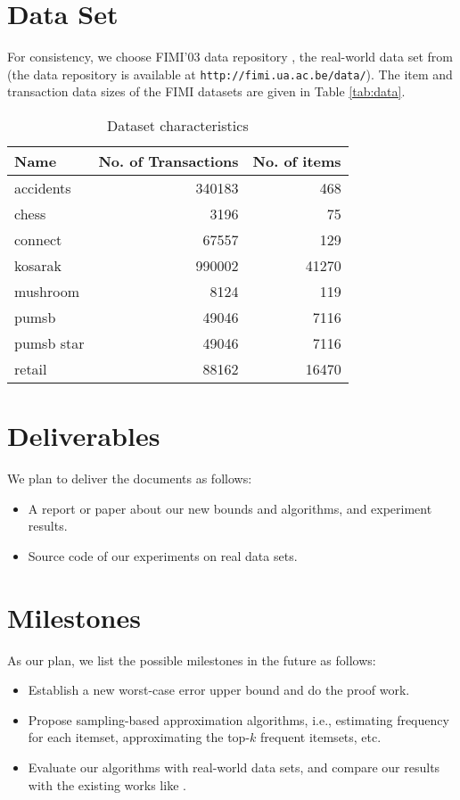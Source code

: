 \documentclass{article}
\begin{document}
\section{Data Set}
For consistency, we choose FIMI'03 data repository \cite{GZ04}, the real-world data set from \cite{RU15} (the data repository is available at \texttt{http://fimi.ua.ac.be/data/}). The item and transaction data sizes of the FIMI datasets are given in Table \ref{tab:data}.

\begin{table}[!t]
\centering
\begin{tabular}{l | r r}
\hline
Name & No. of Transactions & No. of items \\
\hline
accidents & 340183 & 468 \\
chess & 3196 & 75 \\
connect & 67557 & 129 \\
kosarak & 990002 & 41270 \\
mushroom & 8124 & 119 \\
pumsb & 49046 & 7116 \\
pumsb star & 49046 &  7116 \\
retail  & 88162 & 16470 \\
\hline

\end{tabular}
\caption{Dataset characteristics}
\end{table}

\section{Deliverables}
We plan to deliver the documents as follows:
\begin{itemize}
\item A report or paper about our new bounds and algorithms, and experiment results.
\item Source code of our experiments on real data sets.
\end{itemize}

\section{Milestones}
As our plan, we list the possible milestones in the future as follows:
\begin{itemize}
\item Establish a new worst-case error upper bound and do the proof work.
\item Propose sampling-based approximation algorithms, i.e., estimating frequency for each itemset, approximating the top-$k$ frequent itemsets, etc.
\item Evaluate our algorithms with real-world data sets, and compare our results with the existing works like \cite{RU15}.
\end{itemize}


%


\end{document}
